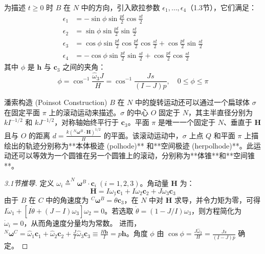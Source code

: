 为描述 \(t \ge 0\) 时 \(B\) 在 \(N\) 中的方向，引入欧拉参数 \(\epsilon_1,\dots,\epsilon_4\)（1.3节），它们满足：
\begin{align}
\epsilon_1 &= -\sin\phi\sin\frac{pt}{2}\cos\frac{st}{2} \tag{5} \\
\epsilon_2 &= \sin\phi\sin\frac{pt}{2}\sin\frac{st}{2} \tag{6} \\
\epsilon_3 &= \cos\phi\sin\frac{pt}{2}\cos\frac{pt}{2}\cos\frac{st}{2} + \cos\frac{pt}{2}\sin\frac{st}{2} \tag{7} \\
\epsilon_4 &= -\cos\phi\sin\frac{pt}{2}\sin\frac{st}{2} + \cos\frac{pt}{2}\cos\frac{st}{2} \tag{8}
\end{align}
其中 \(\phi\) 是 \(\mathbf{h}\) 与 \(\mathbf{c}_3\) 之间的夹角：
\begin{equation}
\phi = \cos^{-1}\frac{\hat{\omega}_3 J}{H} = \cos^{-1}\frac{J s}{(I - J)p}, \quad 0 \le \phi \le \pi \tag{9}
\end{equation}

\begin{myTheorem}{潘索构造 (Poinsot Construction)}
\(B\) 在 \(N\) 中的旋转运动还可以通过一个扁球体 \(\sigma\) 在固定平面 \(\pi\) 上的滚动运动来描述。\(\sigma\) 的中心 \(O\) 固定于 \(N\)，其主半直径分别为 \(k I^{-1/2}\) 和 \(k J^{-1/2}\)，对称轴始终平行于 \(\mathbf{c}_3\)。平面 \(\pi\) 是唯一一个固定于 \(N\)、垂直于 \(\mathbf{H}\) 且与 \(O\) 的距离 \(d = \frac{k(^N\boldsymbol{\omega}^B\cdot\mathbf{H})^{1/2}}{H}\) 的平面。该滚动运动中，\(\sigma\) 上点 \(Q\) 和平面 \(\pi\) 上描绘出的轨迹分别称为**本体极迹 (polhode)** 和**空间极迹 (herpolhode)**。此运动还可以等效为一个圆锥在另一个圆锥上的滚动，分别称为**体锥**和**空间锥**。
\end{myTheorem}

\begin{proof}[3.1节推导]
定义 \(\omega_i \triangleq ^N\boldsymbol{\omega}^B \cdot \mathbf{c}_i \ (i=1,2,3)\)。角动量 \(\mathbf{H}\) 为：
\begin{equation}
\mathbf{H} = I\omega_1\mathbf{c}_1 + I\omega_2\mathbf{c}_2 + J\omega_3\mathbf{c}_3 \tag{13}
\end{equation}
由于 \(B\) 在 \(C\) 中的角速度为 \(^C\boldsymbol{\omega}^B = \dot{\theta}\mathbf{c}_3\)，在 \(N\) 中对 \(\mathbf{H}\) 求导，并令力矩为零，可得 \(I\dot{\omega}_1 + [I\dot{\theta} + (J-I)\omega_3]\omega_2 = 0\)。若选取 \(\dot{\theta} = (1 - J/I)\omega_3\)，则方程简化为 \(\dot{\omega}_i=0\)，从而角速度分量均为常数。
进而，\(^N\boldsymbol{\omega}^C = \hat{\omega}_1\mathbf{c}_1 + \hat{\omega}_2\mathbf{c}_2 + \frac{J}{I}\hat{\omega}_3\mathbf{c}_3 \equiv \frac{H\mathbf{h}}{I} = p\mathbf{h}\)。角度 \(\phi\) 由 \(\cos\phi = \frac{J\hat{\omega}_3}{H} = \frac{J s}{(I-J)p}\) 确定。
\end{proof}

